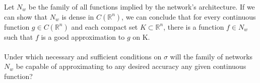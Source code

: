 \documentclass[../main.tex]{subfiles}
\begin{document}
	 \noindent Let $N_{w}$ be the family of all functions implied by the network's architecture.  If we can show that $N_{w}$ is dense in $C(\mathbb{R}^n)$, we can conclude that for every continuous function $g \in C(\mathbb{R}^n) $ and each compact set $K \subset \mathbb{R}^n$, there is a function $f \in N_{w}$ such that $f$ is a good approximation to $g$ on K. \\ \\
	 \noindent Under which necessary and sufficient conditions on $\sigma$ will the family of networks $N_w$ be capable of approximating to any desired accuracy any given continuous function?
	 
	
\end{document}
